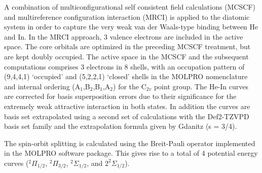 \documentclass[twoside,twocolumn,9pt]{article}
\begin{document}
A combination of multiconfigurational self consistent field calculations (MCSCF\cite{Knowles1985, Werner1985}) and multireference configuration interaction (MRCI\cite{WK88, KW92}) is applied to the diatomic system in order to capture the very weak van der Waals-type binding between He and In. In the MRCI approach, 3 valence electrons are included in the active space. The core orbitals are optimized in the preceding MCSCF treatment, but are kept doubly occupied.
The active space in the MCSCF and the subsequent computations comprises 3 electrons in 8 shells, with an occupation pattern of (9,4,4,1) `occupied' and (5,2,2,1) `closed' shells in the MOLPRO nomenclature and internal ordering (A$_1$,B$_2$,B$_1$,A$_2$) for the C$_{2v}$ point group. The He-In curves are corrected for basis superposition errors due to their significance for the extremely weak attractive interaction in both states.\cite{boys70} In addition the curves are basis set extrapolated using a second set of calculations with the Def2-TZVPD basis set family and the extrapolation formula given by Gdanitz \cite{Gdanitz2000} (s = 3/4).

The spin-orbit splitting is calculated using the Breit-Pauli operator implemented in the MOLPRO software package. This gives rise to a total of 4 potential energy curves ($^2\Pi_{1/2}$, $^2\Pi_{3/2} $, $^2\Sigma_{1/2} $, and $2^2\Sigma_{1/2}$). 
\end{document}
